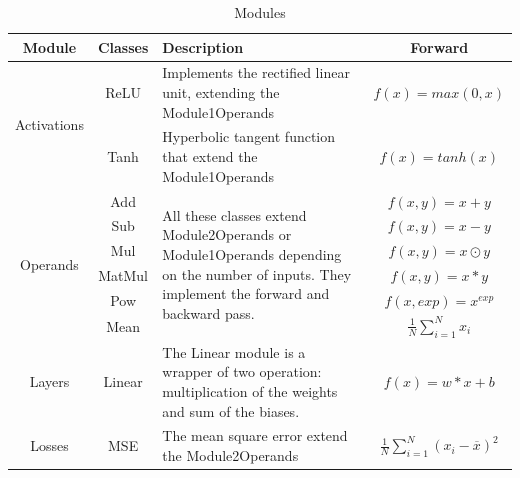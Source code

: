\documentclass[10pt,conference,compsocconf]{IEEEtran}
\begin{document}
\begin{table}
	\caption{Modules}
	\label{tab:modules}
	\begin{tabular}{ | c | c | p{10cm} | c | } 
		\hline
		Module & Classes & Description & Forward  \\
		\hline
		\multirow{2}{4em}{Activations} 
		& ReLU & Implements the rectified linear unit, extending the Module1Operands & $f(x) = max(0, x)$  \\
		& Tanh & Hyperbolic tangent function that extend the Module1Operands & $f(x) = tanh(x)$ \\
		\hline
		\multirow{6}{4em}{Operands}
		& Add & \multirow{6}{30em}{All these classes extend Module2Operands or Module1Operands depending on the number of inputs. They implement the forward and backward pass. } & $f(x, y) = x + y$ \\
		& Sub & & $f(x, y) = x - y$ \\ 
		& Mul & & $f(x, y) = x \odot y$ \\ 
		& MatMul & & $f(x, y) = x * y$ \\ 
		& Pow & & $f(x, exp) = x^{exp}$ \\ 
		& Mean & & $\frac{1}{N} \sum_{i=1}^N x_i$ \\
		\hline
		Layers & Linear & The Linear module is a wrapper of two operation: multiplication of the weights and sum of the biases. & $f(x) = w*x + b$ \\ 
		\hline
		Losses & MSE & The mean square error extend the Module2Operands & $\frac{1}{N} \sum_{i=1}^N (x_i - \overline{x})^2$  \\ 
		\hline
	\end{tabular}
\end{table}
\end{document}
